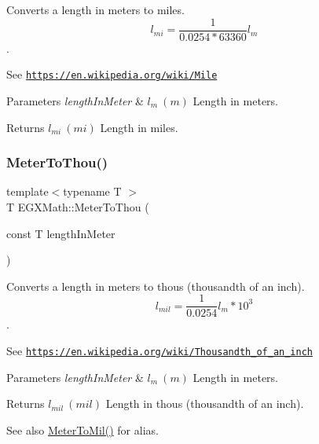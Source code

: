 Converts a length in meters to miles. \[ l_{mi}=\frac{1}{0.0254 * 63360} l_{m} \]. 

See \href{https://en.wikipedia.org/wiki/Mile}{\tt https\+://en.\+wikipedia.\+org/wiki/\+Mile} 
\begin{DoxyParams}{Parameters}
{\em length\+In\+Meter} & $ l_{m}\ (m)$ Length in meters. \\
\hline
\end{DoxyParams}
\begin{DoxyReturn}{Returns}
$ l_{mi}\ (mi)$ Length in miles. 
\end{DoxyReturn}
\mbox{\label{group___e_g_x_math-_conversions-_length_conversions-_s_i-_meter-_imperial_gaebe39a6b8485aae53724390225f27a66}} 
\subsubsection{\texorpdfstring{Meter\+To\+Thou()}{MeterToThou()}}
{\footnotesize\ttfamily template$<$typename T $>$ \\
T E\+G\+X\+Math\+::\+Meter\+To\+Thou (\begin{DoxyParamCaption}\item[{const T}]{length\+In\+Meter }\end{DoxyParamCaption})}



Converts a length in meters to thous (thousandth of an inch). \[ l_{mil}= \frac{1}{0.0254} l_{m} * 10^{3} \]. 

See \href{https://en.wikipedia.org/wiki/Thousandth_of_an_inch}{\tt https\+://en.\+wikipedia.\+org/wiki/\+Thousandth\+\_\+of\+\_\+an\+\_\+inch} 
\begin{DoxyParams}{Parameters}
{\em length\+In\+Meter} & $ l_{m}\ (m)$ Length in meters. \\
\hline
\end{DoxyParams}
\begin{DoxyReturn}{Returns}
$ l_{mil}\ (mil)$ Length in thous (thousandth of an inch). 
\end{DoxyReturn}
\begin{DoxySeeAlso}{See also}
\mbox{\hyperlink{group___e_g_x_math-_conversions-_length_conversions-_s_i-_meter-_imperial_ga6a58893d0f7e17e425c7bd0b3235320d}{Meter\+To\+Mil()}} for alias. 
\end{DoxySeeAlso}
\mbox{\label{group___e_g_x_math-_conversions-_length_conversions-_s_i-_meter-_imperial_ga958e4dfc661ba34f49bc3aaebe6e30be}} 
